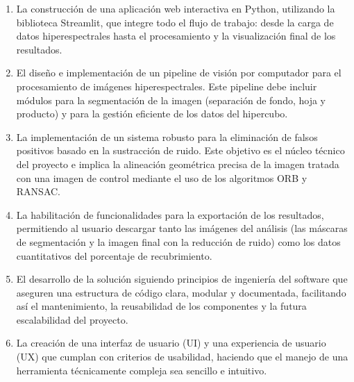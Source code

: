 \begin{enumerate}
    \item La construcción de una aplicación web interactiva en Python, utilizando la biblioteca Streamlit, que integre todo el flujo de trabajo: desde la carga de datos hiperespectrales hasta el procesamiento y la visualización final de los resultados.
    \item El diseño e implementación de un pipeline de visión por computador para el procesamiento de imágenes hiperespectrales. Este pipeline debe incluir módulos para la segmentación de la imagen (separación de fondo, hoja y producto) y para la gestión eficiente de los datos del hipercubo.
    \item La implementación de un sistema robusto para la eliminación de falsos positivos basado en la sustracción de ruido. Este objetivo es el núcleo técnico del proyecto e implica la alineación geométrica precisa de la imagen tratada con una imagen de control mediante el uso de los algoritmos ORB y RANSAC.
    \item La habilitación de funcionalidades para la exportación de los resultados, permitiendo al usuario descargar tanto las imágenes del análisis (las máscaras de segmentación y la imagen final con la reducción de ruido) como los datos cuantitativos del porcentaje de recubrimiento.
    \item El desarrollo de la solución siguiendo principios de ingeniería del software que aseguren una estructura de código clara, modular y documentada, facilitando así el mantenimiento, la reusabilidad de los componentes y la futura escalabilidad del proyecto.
    \item La creación de una interfaz de usuario (UI) y una experiencia de usuario (UX) que cumplan con criterios de usabilidad, haciendo que el manejo de una herramienta técnicamente compleja sea sencillo e intuitivo.

\end{enumerate}

